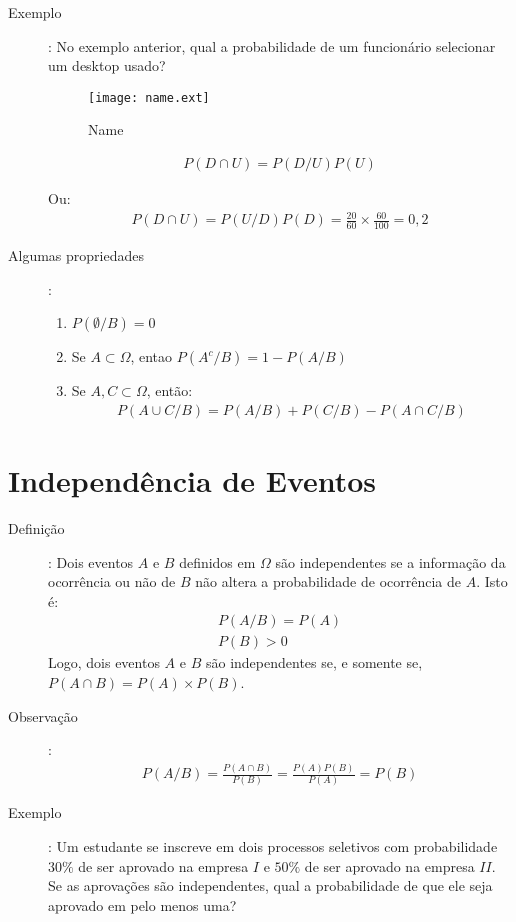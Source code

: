 \documentclass[11pt,a4paper]{book}
\begin{document}
\begin{description}
\begin{description}
  \item[Exemplo]: No exemplo anterior, qual a probabilidade de um funcionário selecionar um 
desktop usado?
\begin{figure}[htpb]
  \centering
  \texttt{[image: name.ext]}
  \caption{Name}
  \label{fig:18}
\end{figure}
\begin{align*}
  P(D \cap U)= P(D/U)P(U)
\end{align*}

Ou:
\begin{align*}
  P(D \cap U)= P(U/D)P(D)= \frac{20}{60}\times \frac{60}{100}= 0,2
\end{align*}

\item [Algumas propriedades]:
\begin{enumerate}[label=(\alph*)]
  \item $P(\emptyset / B)=0$
  \item Se $A \subset \Omega$, entao $P(A^c / B)= 1-P(A/B)$
  \item Se $A,C \subset \Omega$, então:
    \begin{align}
      P(A \cup C / B)= P(A/B)+ P(C/B) - P(A \cap C/B)
    \end{align}
\end{enumerate}

\end{description}
 \section{Independência de Eventos}

\begin{description}
  \item [Definição]: Dois eventos $A$ e $B$ definidos em $\Omega$ são independentes se 
 a informação da ocorrência ou não de $B$ não altera a probabilidade de ocorrência
 de $A$. Isto é:
 \begin{align}
   P(A/B)= P(A) \\
   P(B)>0 
 \end{align}
 Logo, dois eventos $A$ e $B$ são independentes se, e somente se, $P(A \cap B)=P(A)\times P(B)$.
\item [Observação]: 
  \begin{align*}
    P(A/B) = \frac{P(A \cap B)}{P(B)} = \frac{P(A)P(B)}{P(A)}= P(B)
  \end{align*}
\item [Exemplo]: Um estudante se inscreve em dois processos seletivos com probabilidade 
 $30\%$ de ser aprovado na empresa $I$ e $50\%$ de ser aprovado na empresa $II$. Se 
 as aprovações são independentes, qual a probabilidade de que ele seja aprovado em
 pelo menos uma?


\end{description}
\end{description}
\end{document}
